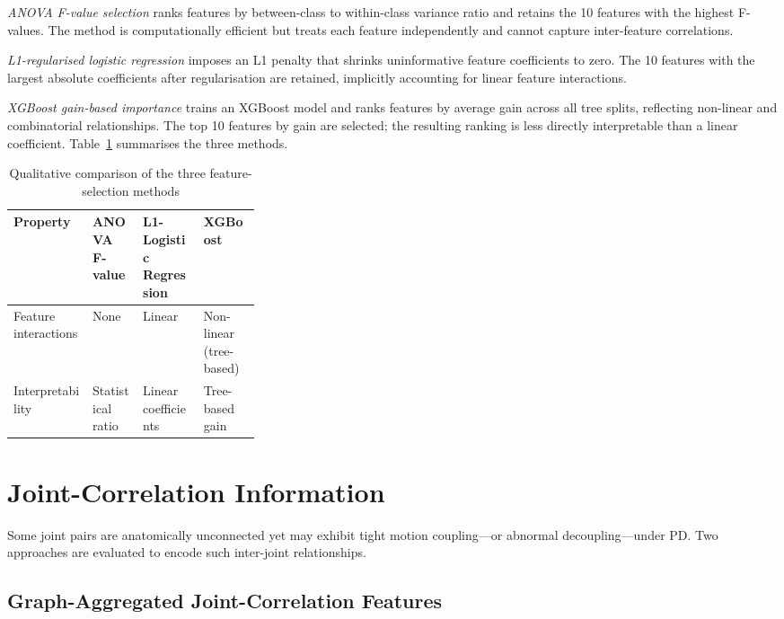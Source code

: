 \emph{ANOVA F-value selection} ranks features by between-class to within-class variance ratio and retains the 10 features with the highest F-values. The method is computationally efficient but treats each feature independently and cannot capture inter-feature correlations.

\emph{L1-regularised logistic regression} imposes an L1 penalty that shrinks uninformative feature coefficients to zero. The 10 features with the largest absolute coefficients after regularisation are retained, implicitly accounting for linear feature interactions.

\emph{XGBoost gain-based importance} trains an XGBoost model and ranks features by average gain across all tree splits, reflecting non-linear and combinatorial relationships. The top 10 features by gain are selected; the resulting ranking is less directly interpretable than a linear coefficient. Table~\ref{tab:fs_methods_comparison} summarises the three methods.

\begin{table}[H]
    \centering
    \caption{Qualitative comparison of the three feature-selection methods}
    \label{tab:fs_methods_comparison}
    \small
    \setlength{\tabcolsep}{6pt}
    \begin{tabularx}{\linewidth}{>{\raggedright\arraybackslash}p{0.32\linewidth} >{\raggedright\arraybackslash}X >{\raggedright\arraybackslash}X >{\raggedright\arraybackslash}X}
        \toprule
        Property & ANOVA F-value & L1-Logistic Regression & XGBoost \\
        \midrule
        Feature interactions & None              & Linear                 & Non-linear (tree-based) \\
        Interpretability     & Statistical ratio & Linear coefficients    & Tree-based gain \\
        \bottomrule
    \end{tabularx}
\end{table}

\section{Joint-Correlation Information}
\label{sec:joint_corr}

Some joint pairs are anatomically unconnected yet may exhibit tight motion coupling---or abnormal decoupling---under PD. Two approaches are evaluated to encode such inter-joint relationships.

\subsection{Graph-Aggregated Joint-Correlation Features}
\label{sec:joint_corr_corr}

